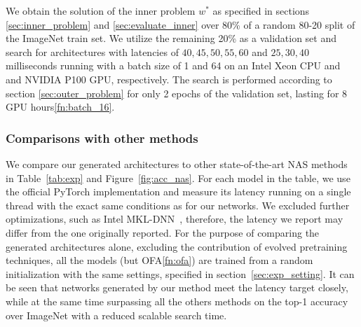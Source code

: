 \documentclass[dvipsnames,table,xcdraw]{article}
\begin{document}
We obtain the solution of the inner problem $w^*$ as specified in sections \ref{sec:inner_problem} and \ref{sec:evaluate_inner} over 80\% of a random 80-20 split of the ImageNet train set. We utilize the remaining 20\% as a validation set and search for architectures with latencies of $40, 45, 50, 55, 60$ and $25, 30, 40$ milliseconds running with a batch size of 1 and 64 on an Intel Xeon CPU and and NVIDIA P100 GPU, respectively. The search is performed according to section \ref{sec:outer_problem} for only 2 epochs of the validation set, lasting for 8 GPU hours\cref{fn:batch_16}. 
\vspace{-0.2em}
\subsubsection{Comparisons with other methods}\label{sec:exp_comparison}
\vspace{-0.2em}
We compare our generated architectures to other state-of-the-art NAS methods in Table~\ref{tab:exp} and Figure~\ref{fig:acc_nas}. 
For each model in the table, we use the official PyTorch implementation \cite{pytorch} and measure its latency running on a single thread with the exact same conditions as for our networks. We excluded further optimizations, such as Intel MKL-DNN~\cite{mkl_dnn}, therefore, the latency we report may differ from the one originally reported. 
For the purpose of comparing the generated architectures alone, excluding the contribution of evolved pretraining techniques, all the models (but OFA\cref{fn:ofa}) are trained from a random initialization with the same settings, specified in section~\ref{sec:exp_setting}. 
It can be seen that networks generated by our method meet the latency target closely, while at the same time surpassing all the others methods on the top-1 accuracy over ImageNet with a reduced scalable search time. 
\end{document}
